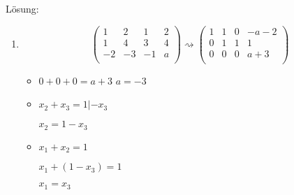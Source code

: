 \documentclass[main.tex]{subfiles}
\begin{document}
\begin{enumerate}
	      Lösung:
	      \begin{enumerate}
		      \item \[
			            \begin{pmatrix}
				            1  & 2  & 1  & 2 \\
				            1  & 4  & 3  & 4 \\
				            -2 & -3 & -1 & a \\
			            \end{pmatrix}
			            \rightsquigarrow
			            \begin{pmatrix}
				            1 & 1 & 0 & -a-2 \\
				            0 & 1 & 1 & 1    \\
				            0 & 0 & 0 & a+3  \\
			            \end{pmatrix}
		            \]
		            \begin{multicols}{3}
			            \begin{itemize}
						\item[] \( 0 + 0 + 0 = a + 3 \)
						\( a = -3 \)

				            \item[] \( x_2 + x_3 = 1 | -x_3 \)

				                  \( x_2 = 1 - x_3 \)
				            \item[] \( x_1 + x_2 = 1 \)

				                  \( x_1 + (1-x_3) = 1 \)

				                  \( x_1 = x_3 \)
			            \end{itemize}
		            \end{multicols}
	      \end{enumerate}
\end{enumerate}
\end{document}
